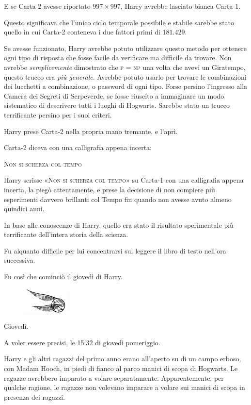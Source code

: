 E se Carta-2 avesse riportato $997 \times 997$, Harry avrebbe lasciato bianca Carta-1.

Questo significava che l’unico ciclo temporale possibile e stabile sarebbe stato quello in cui Carta-2 conteneva i due fattori primi di $181.429$.

Se avesse funzionato, Harry avrebbe potuto utilizzare questo metodo per ottenere ogni tipo di risposta che fosse facile da verificare ma difficile da trovare. Non avrebbe \textit{semplicemente} dimostrato che \textsc{p = np} una volta che avevi un Giratempo, questo trucco era \textit{più generale}. Avrebbe potuto usarlo per trovare le combinazioni dei lucchetti a combinazione, o password di ogni tipo. Forse persino l’ingresso alla Camera dei Segreti di Serpeverde, se fosse riuscito a immaginare un modo sistematico di descrivere tutti i luoghi di Hogwarts. Sarebbe stato un trucco terrificante persino per i suoi criteri.

Harry prese Carta-2 nella propria mano tremante, e l’aprì.

Carta-2 diceva con una calligrafia appena incerta:

\textsc{Non si scherza col tempo}

Harry scrisse «\textsc{Non si scherza col tempo}» su Carta-1 con una calligrafia appena incerta, la piegò attentamente, e prese la decisione di non compiere più esperimenti davvero brillanti col Tempo fin quando non avesse avuto almeno quindici anni.

In base alle conoscenze di Harry, quello era stato il risultato sperimentale più terrificante dell’intera storia della scienza.

Fu alquanto difficile per lui concentrarsi sul leggere il libro di testo nell’ora successiva.

Fu così che cominciò il giovedì di Harry.

\begin{figure}[h!]
        \includegraphics[scale=0.4]{boccino.png}
        \centering
\end{figure}

Giovedì.

A voler essere precisi, le 15:32 di giovedì pomeriggio.

Harry e gli altri ragazzi del primo anno erano all’aperto su di un campo erboso, con Madam Hooch, in piedi di fianco al parco manici di scopa di Hogwarts. Le ragazze avrebbero imparato a volare separatamente. Apparentemente, per qualche ragione, le ragazze non volevano imparare a volare sui manici di scopa in presenza dei ragazzi.

